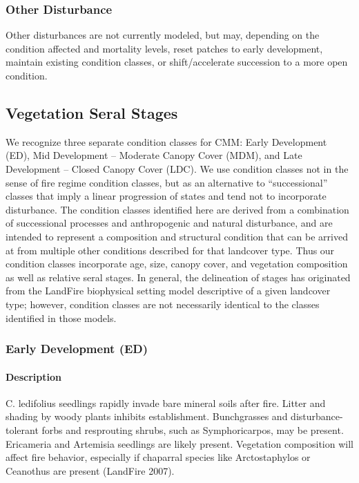 \subsubsection{Other Disturbance}
Other disturbances are not currently modeled, but may, depending on the condition affected and mortality levels, reset patches to early development, maintain existing condition classes, or shift/accelerate succession to a more open condition. 

\subsection*{Vegetation Seral Stages}
We recognize three separate condition classes for CMM: Early Development (ED), Mid Development – Moderate Canopy Cover (MDM), and Late Development – Closed Canopy Cover (LDC). We use condition classes not in the sense of fire regime condition classes, but as an alternative to ``successional'' classes that imply a linear progression of states and tend not to incorporate disturbance. The condition classes identified here are derived from a combination of successional processes and anthropogenic and natural disturbance, and are intended to represent a composition and structural condition that can be arrived at from multiple other conditions described for that landcover type. Thus our condition classes incorporate age, size, canopy cover, and vegetation composition as well as relative seral stages. In general, the delineation of stages has originated from the LandFire biophysical setting model descriptive of a given landcover type; however, condition classes are not necessarily identical to the classes identified in those models.

\subsubsection{Early Development (ED)}

\paragraph{Description} C. ledifolius seedlings rapidly invade bare mineral soils after fire. Litter and shading by woody plants inhibits establishment. Bunchgrasses and disturbance-tolerant forbs and resprouting shrubs, such as Symphoricarpos, may be present. Ericameria and Artemisia seedlings are likely present. Vegetation composition will affect fire behavior, especially if chaparral species like Arctostaphylos or Ceanothus are present (LandFire 2007).

